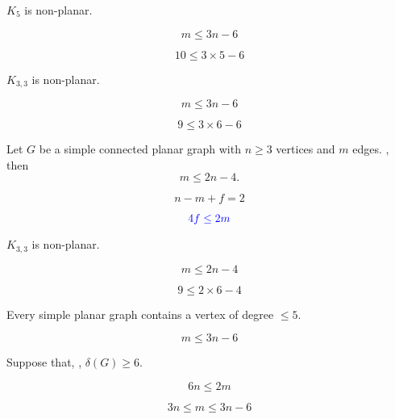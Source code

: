 \begin{frame}{}
  \begin{theorem}
    $K_{5}$ is non-planar.
  \end{theorem}


  \pause
  \[
    m \le 3n -6
  \]

  \pause
  \[
    10 \le 3 \times 5 - 6
  \]
\end{frame}

\begin{frame}{}
  \begin{theorem}
    $K_{3, 3}$ is non-planar.
  \end{theorem}


  \pause
  \[
    m \le 3n -6
  \]

  \pause
  \[
    9 \le 3 \times 6 - 6
  \]

  \pause
\end{frame}

\begin{frame}{}
  \begin{theorem}
    Let $G$ be a simple connected planar graph with $n \ge 3$ vertices
    and $m$ edges. , then
    \[
      m \le 2n - 4.
    \]
  \end{theorem}

  \pause
  \[
    n - m + f = 2
  \]

  \pause
  \[
    \textcolor{blue}{4f \le 2m}
  \]
\end{frame}

\begin{frame}{}
  \begin{theorem}
    $K_{3, 3}$ is non-planar.
  \end{theorem}

  \pause
  \[
    m \le 2n -4
  \]

  \pause
  \[
    9 \le 2 \times 6 - 4
  \]
\end{frame}

\begin{frame}{}
  \begin{theorem}
    Every simple planar graph contains a vertex of degree $\le 5$.
  \end{theorem}

  \pause
  \[
    m \le 3n - 6
  \]

  \pause
  \begin{center}
    Suppose that, , $\delta(G) \ge 6$.
  \end{center}

  \pause
  \[
    6n \le 2m
  \]

  \pause
  \[
    3n \le m \le 3n - 6
  \]
\end{frame}
